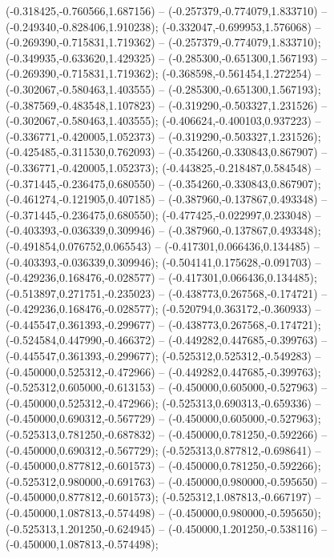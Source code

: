  (-0.318425,-0.760566,1.687156) -- (-0.257379,-0.774079,1.833710) -- (-0.249340,-0.828406,1.910238);
 (-0.332047,-0.699953,1.576068) -- (-0.269390,-0.715831,1.719362) -- (-0.257379,-0.774079,1.833710);
 (-0.349935,-0.633620,1.429325) -- (-0.285300,-0.651300,1.567193) -- (-0.269390,-0.715831,1.719362);
 (-0.368598,-0.561454,1.272254) -- (-0.302067,-0.580463,1.403555) -- (-0.285300,-0.651300,1.567193);
 (-0.387569,-0.483548,1.107823) -- (-0.319290,-0.503327,1.231526) -- (-0.302067,-0.580463,1.403555);
 (-0.406624,-0.400103,0.937223) -- (-0.336771,-0.420005,1.052373) -- (-0.319290,-0.503327,1.231526);
 (-0.425485,-0.311530,0.762093) -- (-0.354260,-0.330843,0.867907) -- (-0.336771,-0.420005,1.052373);
 (-0.443825,-0.218487,0.584548) -- (-0.371445,-0.236475,0.680550) -- (-0.354260,-0.330843,0.867907);
 (-0.461274,-0.121905,0.407185) -- (-0.387960,-0.137867,0.493348) -- (-0.371445,-0.236475,0.680550);
 (-0.477425,-0.022997,0.233048) -- (-0.403393,-0.036339,0.309946) -- (-0.387960,-0.137867,0.493348);
 (-0.491854,0.076752,0.065543) -- (-0.417301,0.066436,0.134485) -- (-0.403393,-0.036339,0.309946);
 (-0.504141,0.175628,-0.091703) -- (-0.429236,0.168476,-0.028577) -- (-0.417301,0.066436,0.134485);
 (-0.513897,0.271751,-0.235023) -- (-0.438773,0.267568,-0.174721) -- (-0.429236,0.168476,-0.028577);
 (-0.520794,0.363172,-0.360933) -- (-0.445547,0.361393,-0.299677) -- (-0.438773,0.267568,-0.174721);
 (-0.524584,0.447990,-0.466372) -- (-0.449282,0.447685,-0.399763) -- (-0.445547,0.361393,-0.299677);
 (-0.525312,0.525312,-0.549283) -- (-0.450000,0.525312,-0.472966) -- (-0.449282,0.447685,-0.399763);
 (-0.525312,0.605000,-0.613153) -- (-0.450000,0.605000,-0.527963) -- (-0.450000,0.525312,-0.472966);
 (-0.525313,0.690313,-0.659336) -- (-0.450000,0.690312,-0.567729) -- (-0.450000,0.605000,-0.527963);
 (-0.525313,0.781250,-0.687832) -- (-0.450000,0.781250,-0.592266) -- (-0.450000,0.690312,-0.567729);
 (-0.525313,0.877812,-0.698641) -- (-0.450000,0.877812,-0.601573) -- (-0.450000,0.781250,-0.592266);
 (-0.525312,0.980000,-0.691763) -- (-0.450000,0.980000,-0.595650) -- (-0.450000,0.877812,-0.601573);
 (-0.525312,1.087813,-0.667197) -- (-0.450000,1.087813,-0.574498) -- (-0.450000,0.980000,-0.595650);
 (-0.525313,1.201250,-0.624945) -- (-0.450000,1.201250,-0.538116) -- (-0.450000,1.087813,-0.574498);
